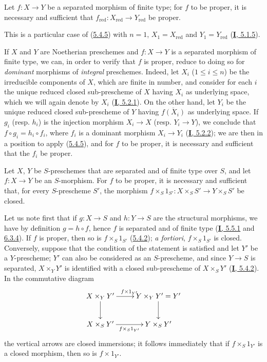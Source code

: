 \begin{corollary}[5.4.6]
\label{II.5.4.6}
Let $f:X\to Y$ be a separated morphism of finite type; for $f$ to be
proper, it is necessary and sufficient that
$f_{\mathrm{red}}:X_{\mathrm{red}}\to Y_{\mathrm{red}}$ be proper.
\end{corollary}

This is a particular case of (\hyperref[II.5.4.5]{5.4.5}) with $n=1$,
$X_1=X_{\mathrm{red}}$ and $Y_1=Y_{\mathrm{red}}$
(\hyperref[I.5.1.5]{\textbf{I}, 5.1.5}).

\begin{env}[5.4.7]
\label{II.5.4.7}
If $X$ and $Y$ are Noetherian preschemes and $f:X\to Y$ is a
separated morphism of finite type, we can, in order to verify that $f$ is
proper, reduce to doing so for \emph{dominant} morphisms of \emph{integral} preschemes.
Indeed, let $X_i$ ($1\leq i\leq n$) be the irreducible components of $X$,
which are finite in number, and consider for each $i$ the unique reduced
closed sub-prescheme of $X$ having $X_i$ as underlying space, which we will
again denote by $X_i$ (\hyperref[I.5.2.1]{\textbf{I}, 5.2.1}). On the other hand,
let $Y_i$ be the unique reduced closed sub-prescheme of $Y$ having
$\overline{f(X_i)}$ as underlying space. If $g_i$ (resp. $h_i$) is the
injection morphism $X_i\to X$ (resp. $Y_i\to Y$), we conclude that
$f\circ g_i=h_i\circ f_i$, where $f_i$ is a dominant morphism $X_i\to Y_i$
(\hyperref[I.5.2.2]{\textbf{I}, 5.2.2}); we are then in a position to apply
(\hyperref[II.5.4.5]{5.4.5}), and for $f$ to be proper, it is necessary
and sufficient that the $f_i$ be proper.
\end{env}

\begin{corollary}[5.4.8]
\label{II.5.4.8}
Let $X$, $Y$ be $S$-preschemes that are separated and of finite type over
$S$, and let $f:X\to Y$ be an $S$-morphism. For $f$ to be proper, it is
necessary and sufficient that, for every $S$-prescheme $S'$, the morphism
$f\times_S1_{S'}:X\times_SS'\to Y\times_SS'$ be closed.
\end{corollary}

Let us note first that if $g:X\to S$ and $h:Y\to S$ are the structural
morphisms, we have by definition $g=h\circ f$, hence $f$ is separated and of
finite type (\hyperref[I.5.5.1]{\textbf{I}, 5.5.1} and
\hyperref[I.6.3.4]{6.3.4}). If $f$ is proper, then so is
$f\times_S1_{S'}$ (\hyperref[II.5.4.2]{5.4.2}); \emph{a fortiori},
$f\times_S1_{S'}$ is closed. Conversely, suppose that the condition of the
statement is satisfied and let $Y'$ be a $Y$-prescheme; $Y'$ can also be
considered as an $S$-prescheme, and since $Y\to S$ is separated,
$X\times_YY'$ is identified with a closed sub-prescheme of $X\times_SY'$
(\hyperref[I.5.4.2]{\textbf{I}, 5.4.2}). In the commutative diagram
\[
  \xymatrix{
    X\times_YY'\ar[r]^{f\times1_{Y'}}\ar[d] &
    Y\times_YY'=Y'\ar[d]\\
    X\times_SY'\ar[r]_{f\times_S1_{Y'}} & Y\times_SY'
  }
\]
the vertical arrows are closed immersions; it follows immediately
that if $f\times_S1_{Y'}$ is a closed morphism, then so is
$f\times1_{Y'}$.

